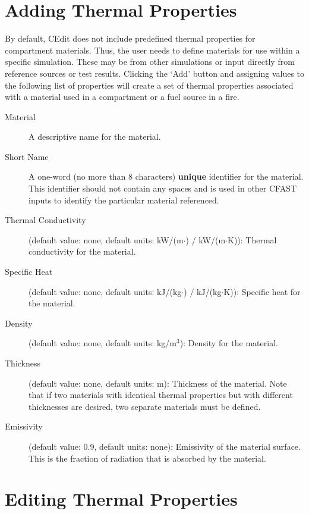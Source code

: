 \section{Adding Thermal Properties}
\label{info:MATL}

By default, CEdit does not include predefined thermal properties for compartment materials. Thus, the user needs to define materials for use within a specific simulation. These may be from other simulations or input directly from reference sources or test results. Clicking the `Add' button and assigning values to the following list of properties will create a set of thermal properties associated with a material used in a compartment or a fuel source in a fire.

\begin{description}
\item[Material] A descriptive name for the material.

\item[Short Name] A one-word (no more than 8 characters) \textbf{unique} identifier for the material.  This identifier should not contain any spaces and is used in other CFAST inputs to identify the particular material referenced.

\item[Thermal Conductivity] (default value: none, default units: kW/(m$\cdot$\degc) / kW/(m$\cdot$K)): Thermal conductivity for the material.

\item[Specific Heat] (default value: none, default units: kJ/(kg$\cdot$\degc) / kJ/(kg$\cdot$K)): Specific heat for the material.

\item[Density] (default value: none, default units: kg/m$^3$): Density for the material.

\item[Thickness] (default value: none, default units: m): Thickness of the material.  Note that if two materials with identical thermal properties but with different thicknesses are desired, two separate materials must be defined.

\item[Emissivity] (default value: 0.9, default units: none): Emissivity of the material surface.  This is the fraction of radiation that is absorbed by the material.
\end{description}




\section{Editing Thermal Properties}


